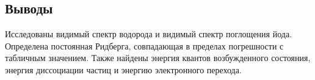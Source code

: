 \subsection*{Выводы}

Исследованы видимый спектр водорода и видимый спектр поглощения йода. Определена постоянная Ридберга, совпадающая в пределах погрешности с табличным значением. Также найдены энергия квантов возбужденного состояния, энергия диссоциации частиц и энергию электронного перехода. 